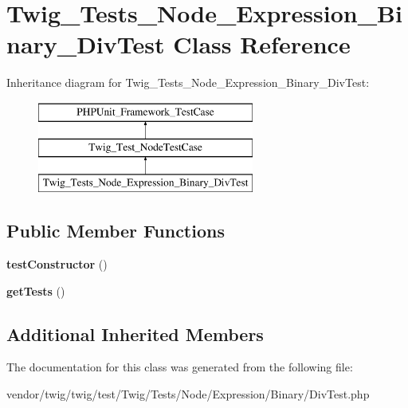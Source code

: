 \hypertarget{classTwig__Tests__Node__Expression__Binary__DivTest}{}\section{Twig\+\_\+\+Tests\+\_\+\+Node\+\_\+\+Expression\+\_\+\+Binary\+\_\+\+Div\+Test Class Reference}
\label{classTwig__Tests__Node__Expression__Binary__DivTest}
Inheritance diagram for Twig\+\_\+\+Tests\+\_\+\+Node\+\_\+\+Expression\+\_\+\+Binary\+\_\+\+Div\+Test\+:\begin{figure}[H]
\begin{center}
\leavevmode
\includegraphics[height=3.000000cm]{classTwig__Tests__Node__Expression__Binary__DivTest}
\end{center}
\end{figure}
\subsection*{Public Member Functions}
\begin{DoxyCompactItemize}
\item 
{\bfseries test\+Constructor} ()\hypertarget{classTwig__Tests__Node__Expression__Binary__DivTest_aa9b827142116a0deddf3061eb3d078a8}{}\label{classTwig__Tests__Node__Expression__Binary__DivTest_aa9b827142116a0deddf3061eb3d078a8}

\item 
{\bfseries get\+Tests} ()\hypertarget{classTwig__Tests__Node__Expression__Binary__DivTest_ad9e5cbe1a0a4b9809b7a9954f2a2d1a9}{}\label{classTwig__Tests__Node__Expression__Binary__DivTest_ad9e5cbe1a0a4b9809b7a9954f2a2d1a9}

\end{DoxyCompactItemize}
\subsection*{Additional Inherited Members}


The documentation for this class was generated from the following file\+:\begin{DoxyCompactItemize}
\item 
vendor/twig/twig/test/\+Twig/\+Tests/\+Node/\+Expression/\+Binary/Div\+Test.\+php\end{DoxyCompactItemize}
